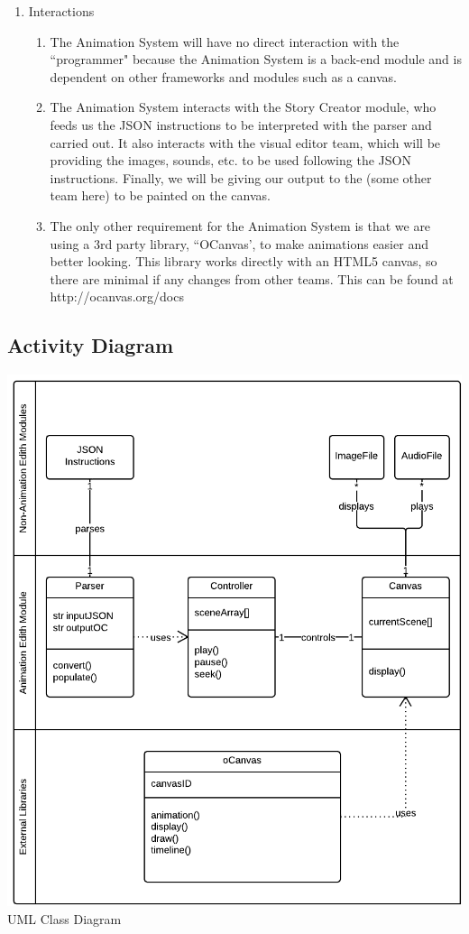 \documentclass[12pt]{article}
\begin{document}
\begin{enumerate}
\item Interactions
\begin{enumerate}
\item The Animation System will have no direct interaction with the ``programmer" because the Animation System is a back-end module and is dependent on other frameworks and modules such as a canvas.
\item The Animation System interacts with the Story Creator module, who feeds us the JSON instructions to be interpreted with the parser and carried out. It also interacts with the visual editor team, which will be providing the images, sounds, etc. to be used following the JSON instructions. Finally, we will be giving our output to the (some other team here) to be painted on the canvas.
\item The only other requirement for the Animation System is that we are using a 3rd party library, ``OCanvas', to make animations easier and better looking. This library works directly with an HTML5 canvas, so there are minimal if any changes from other teams. This can be found at http://ocanvas.org/docs

\end{enumerate}



\end{enumerate}

\subsection{Activity Diagram}
\includegraphics[scale=.45]{AnimationUMLClassDiagram.png}
\\UML Class Diagram
\pagebreak
\end{document}
